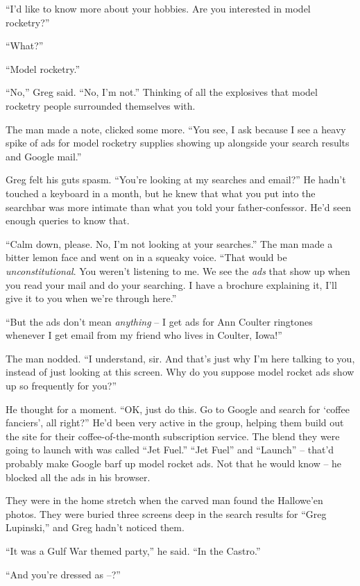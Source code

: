 “I'd like to know more about your hobbies. Are you interested in 
model rocketry?”

“What?”

“Model rocketry.”

“No,” Greg said. “No, I'm not.” Thinking of all the explosives 
that model rocketry people surrounded themselves with.

The man made a note, clicked some more. “You see, I ask because I see 
a heavy spike of ads for model rocketry supplies showing up alongside 
your search results and Google mail.”

Greg felt his guts spasm. “You're looking at my searches and 
email?” He hadn't touched a keyboard in a month, but he knew that 
what you put into the searchbar was more intimate than what you told 
your father-confessor. He'd seen enough queries to know that.

“Calm down, please. No, I'm not looking at your searches.” The man 
made a bitter lemon face and went on in a squeaky voice. “That would 
be \emph{unconstitutional}. You weren't listening to me. We see the 
\emph{ads} that show up when you read your mail and do your searching. 
I have a brochure explaining it, I'll give it to you when we're through 
here.”

“But the ads don't mean \emph{anything} -- I get ads for Ann Coulter 
ringtones whenever I get email from my friend who lives in Coulter, 
Iowa!”

The man nodded. “I understand, sir. And that's just why I'm here 
talking to you, instead of just looking at this screen. Why do you 
suppose model rocket ads show up so frequently for you?”

He thought for a moment. “OK, just do this. Go to Google and search 
for `coffee fanciers', all right?” He'd been very active in the 
group, helping them build out the site for their coffee-of-the-month 
subscription service. The blend they were going to launch with was 
called “Jet Fuel.” “Jet Fuel” and “Launch” -- that'd 
probably make Google barf up model rocket ads. Not that he would know 
-- he blocked all the ads in his browser.

\tb

They were in the home stretch when the carved man found the Hallowe'en 
photos. They were buried three screens deep in the search results for 
“Greg Lupinski,” and Greg hadn't noticed them.

“It was a Gulf War themed party,” he said. “In the Castro.”

“And you're dressed as --?”

